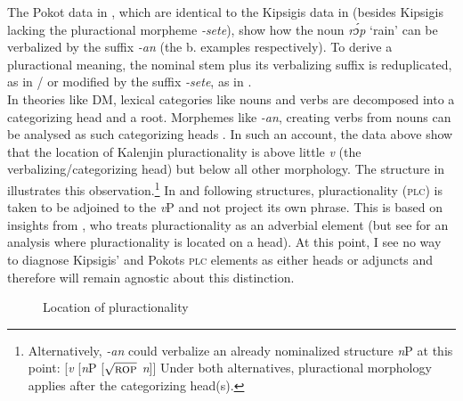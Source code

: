 \documentclass[output=paper,colorlinks,citecolor=brown
]{langscibook}
\begin{document}
\noindent The Pokot data in , which are identical to the Kipsigis data in  (besides Kipsigis lacking the pluractional morpheme \textit{-sete}), show how the noun \textit{rɔ́p} `rain' can be verbalized by the suffix \textit{-an} (the b. examples respectively). To derive a pluractional meaning, the nominal stem plus its verbalizing suffix is reduplicated, as in / or modified by the suffix \textit{-sete}, as in .\\
In theories like DM, lexical categories like nouns and verbs are decomposed into a categorizing head and a root. Morphemes like \textit{-an}, creating verbs from nouns can be analysed as such categorizing heads \citep{Marantz97}. In such an account, the data above show that the location of Kalenjin pluractionality is above little \textit{v} (the verbalizing/categorizing head) but below all other morphology. The structure in  illustrates this observation.\footnote{Alternatively, \textit{-an} could verbalize an already nominalized structure \textit{n}P at this point: [\textit{v} [\textit{n}P [$\sqrt{\textsc{rop}}$ \textit{n}]] Under both alternatives, pluractional morphology applies after the categorizing head(s).} In  and following structures, pluractionality (\textsc{plc}) is taken to be adjoined to the \textit{v}P and not project its own phrase. This is based on insights from \citet{Amato2018}, who treats pluractionality as an adverbial element (but see \citealt{Thornton2020} for an analysis where pluractionality is located on a head). At this point, I see no way to diagnose Kipsigis' and Pokots \textsc{plc} elements as either heads or adjuncts and therefore will remain agnostic about this distinction.


\begin{figure}
\caption{Location of pluractionality\label{fig:fiebig:locPLAC}}
\end{figure}
\end{document}
